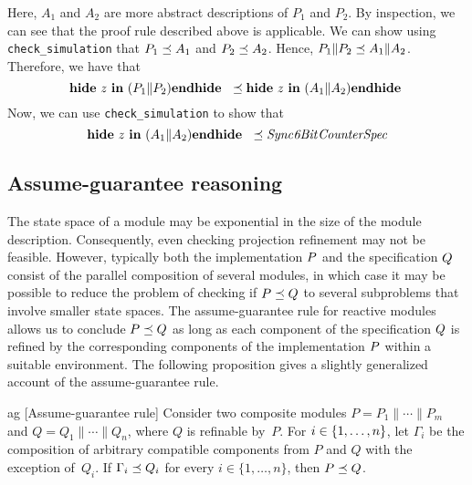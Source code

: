 Here, $A_1$ and $A_2$ are more abstract descriptions of $P_1$ and
$P_2$. By inspection, we can see that the proof rule described above
is applicable.
We can show using {\tt check\_simulation} that $P_1 \preceq A_1$ and
$P_2 \preceq A_2$. Hence, $P_1 \| P_2 \preceq A_1
\| A_2$. Therefore, we have that 
\begin{displaymath}
\hbox{\bf hide}\ z\ \hbox{\bf in}\ (P_1 \| P_2) {\bf endhide}\;\ \preceq \hbox{\bf hide}\ z\ \hbox{\bf in}\ (A_1 \| A_2) {\bf endhide}\; 
\end{displaymath}
Now, we can use {\tt check\_simulation} to show that 
\begin{displaymath}
\hbox{\bf hide}\ z\ \hbox{\bf in}\ (A_1 \| A_2) {\bf endhide}\;\ \preceq {\it Sync\-6Bit\-CounterSpec\/}
\end{displaymath}
 

\subsection{Assume-guarantee reasoning}
The state space of a module may be exponential in the size of the module
description.  Consequently, even checking projection refinement may not be
feasible.  However, typically both the implementation ${P}$ and the
specification ${Q}$ consist of the parallel composition of several modules,
in which case it may be possible to reduce the problem of checking if
${P}\preceq{Q}$ to several subproblems that involve smaller state spaces.
The assume-guarantee rule for reactive modules \cite{AlurHenzinger96} allows us to
conclude ${P}\preceq{Q}$ as long as each component of the specification
${Q}$ is refined by the corresponding components of the implementation ${P}$
within a suitable environment.  The following proposition gives a slightly 
generalized account of the assume-guarantee rule.
 
\begin {proposition}{ag} 
 [Assume-guarantee rule]
 Consider two composite modules $P = P_1 \| \cdots \| P_m$ and 
 $Q = Q_1 \| \cdots \| Q_n$, where $Q$ is refinable by~$P$.
 For $i\in\{1,\ldots,n\}$, let $\Gamma_i$ be the composition of 
 arbitrary compatible components from $P$ and $Q$ with the exception 
 of~$Q_i$. 
 If $\Gamma_i \preceq Q_i$  for every $i \in \{ 1, \ldots, n\}$,
 then $P \preceq Q$. 
\end {proposition}

